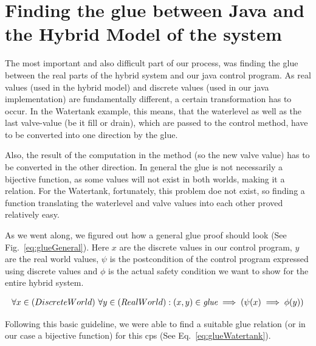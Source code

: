 \section{Finding the glue between Java and the Hybrid Model of the system}
\label{sec:Watertank:Glue}

The most important and also difficult part of our process, was finding the glue between the real parts of the hybrid system and our java control program. As real values (used in the hybrid model) and discrete values (used in our java implementation) are fundamentally different, a certain transformation has to occur.  In the Watertank example, this means, that the waterlevel as well as the last valve-value (be it fill or drain), which are passed to the control method, have to be converted into one direction by the glue. 

Also, the result of the computation in the method (so the new valve value) has to be converted in the other direction. In general the glue is not necessarily a bijective function, as some values will not exist in both worlds, making it a relation. For the Watertank, fortunately, this problem doe not exist, so finding a function translating the waterlevel and valve values into each other proved relatively easy. 

As we went along, we figured out how a general glue proof should look (See Fig.~\ref{eq:glueGeneral}). Here \(x\) are the discrete values in our control program, \(y\) are the real world values, \(\psi\) is the postcondition of the control program expressed using discrete values and \(\phi\) is the actual safety condition we want to show for the entire hybrid system.

\begin{equation}
	\centering
	\begin{split}
		\forall x \in (Discrete World)~\forall y \in (Real World):(x,y) \in \textit{glue} \implies (\psi(x) \implies \phi(y))
	\end{split}
	\label{eq:glueGeneral}
\end{equation}

Following this basic guideline, we were able to find a suitable glue relation (or in our case a bijective function) for this cps (See Eq.~\ref{eq:glueWatertank}).

